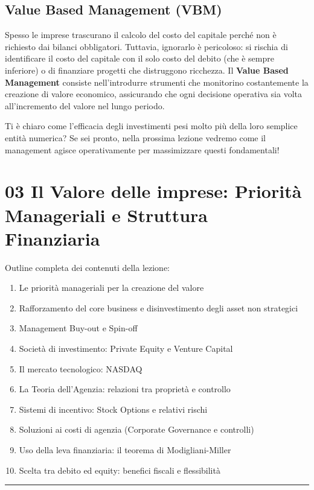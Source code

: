\documentclass[a4paper,10pt]{article}
\begin{document}
\subsection*{Value Based Management (VBM)}

Spesso le imprese trascurano il calcolo del costo del capitale perché non è richiesto dai bilanci obbligatori. Tuttavia, ignorarlo è pericoloso: si rischia di identificare il costo del capitale con il solo costo del debito (che è sempre inferiore) o di finanziare progetti che distruggono ricchezza. Il \textbf{Value Based Management} consiste nell'introdurre strumenti che monitorino costantemente la creazione di valore economico, assicurando che ogni decisione operativa sia volta all'incremento del valore nel lungo periodo.

Ti è chiaro come l'efficacia degli investimenti pesi molto più della loro semplice entità numerica? Se sei pronto, nella prossima lezione vedremo come il management agisce operativamente per massimizzare questi fondamentali!
\section*{03 Il Valore delle imprese: Priorità Manageriali e Struttura Finanziaria}

Outline completa dei contenuti della lezione:
{\small
\begin{enumerate}
\item Le priorità manageriali per la creazione del valore
\item Rafforzamento del core business e disinvestimento degli asset non strategici
\item Management Buy-out e Spin-off
\item Società di investimento: Private Equity e Venture Capital
\item Il mercato tecnologico: NASDAQ
\item La Teoria dell'Agenzia: relazioni tra proprietà e controllo
\item Sistemi di incentivo: Stock Options e relativi rischi
\item Soluzioni ai costi di agenzia (Corporate Governance e controlli)
\item Uso della leva finanziaria: il teorema di Modigliani-Miller
\item Scelta tra debito ed equity: benefici fiscali e flessibilità
\end{enumerate}
}
\hrule
\vspace{0.5cm}
\end{document}

